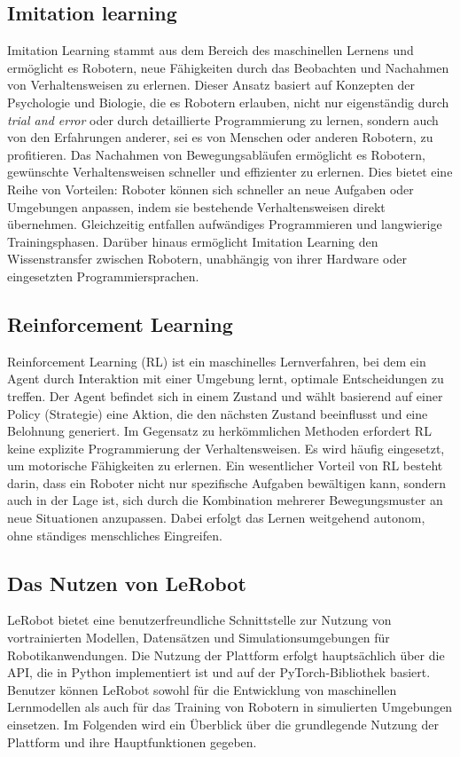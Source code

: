 \documentclass[a4paper, 12pt]{article}
\begin{document}
\subsection{Imitation learning} \label{imitation_learning}
Imitation Learning stammt aus dem Bereich des maschinellen Lernens und ermöglicht es  Robotern, neue Fähigkeiten durch das Beobachten und Nachahmen von Verhaltensweisen zu erlernen. Dieser Ansatz basiert auf Konzepten der Psychologie und Biologie, die es Robotern erlauben, nicht nur eigenständig durch \textit{trial and error} oder durch detaillierte Programmierung zu lernen, sondern auch von den Erfahrungen anderer, sei es von Menschen oder anderen Robotern, zu profitieren.
Das Nachahmen von Bewegungsabläufen ermöglicht es Robotern, gewünschte Verhaltensweisen schneller und effizienter zu erlernen. Dies bietet eine Reihe von Vorteilen: Roboter können sich schneller an neue Aufgaben oder Umgebungen anpassen, indem sie bestehende Verhaltensweisen direkt übernehmen. Gleichzeitig entfallen aufwändiges Programmieren und langwierige Trainingsphasen. Darüber hinaus ermöglicht Imitation Learning den Wissenstransfer zwischen Robotern, unabhängig von ihrer Hardware oder eingesetzten Programmiersprachen. \cite{robot_imitating}

\subsection{Reinforcement Learning} \label{reinforcement_learning}
Reinforcement Learning (RL) ist ein maschinelles Lernverfahren, bei dem ein Agent durch Interaktion mit einer Umgebung lernt, optimale Entscheidungen zu treffen. Der Agent befindet sich in einem Zustand und wählt basierend auf einer Policy (Strategie) eine Aktion, die den nächsten Zustand beeinflusst und eine Belohnung generiert. Im Gegensatz zu herkömmlichen Methoden erfordert RL keine explizite Programmierung der Verhaltensweisen. Es wird häufig eingesetzt, um motorische Fähigkeiten zu erlernen. Ein wesentlicher Vorteil von RL besteht darin, dass ein Roboter nicht nur spezifische Aufgaben bewältigen kann, sondern auch in der Lage ist, sich durch die Kombination mehrerer Bewegungsmuster an neue Situationen anzupassen. Dabei erfolgt das Lernen weitgehend autonom, ohne ständiges menschliches Eingreifen. \cite{learning_motor_skills}

\subsection{Das Nutzen von LeRobot} \label{using_lerobot}
LeRobot bietet eine benutzerfreundliche Schnittstelle zur Nutzung von vortrainierten Modellen, Datensätzen und Simulationsumgebungen für Robotikanwendungen. Die Nutzung der Plattform erfolgt hauptsächlich über die API, die in Python implementiert ist und auf der PyTorch-Bibliothek basiert. Benutzer können LeRobot sowohl für die Entwicklung von maschinellen Lernmodellen als auch für das Training von Robotern in simulierten Umgebungen einsetzen. Im Folgenden wird ein Überblick über die grundlegende Nutzung der Plattform und ihre Hauptfunktionen gegeben.
\end{document}
